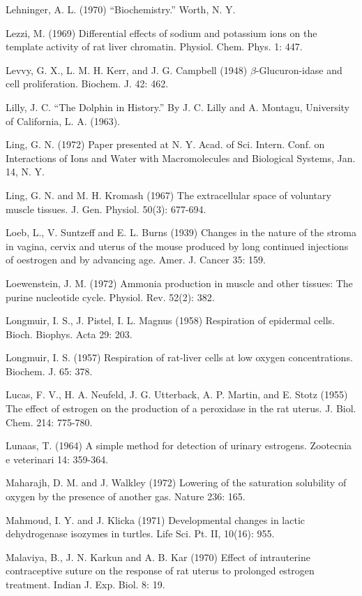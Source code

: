 
Lehninger, A. L. (1970) ``Biochemistry.'' Worth, N. Y.

Lezzi, M. (1969) Differential effects of sodium and potassium ions on the template activity of rat liver chromatin. Physiol. Chem. Phys. 1: 447.

Levvy, G. X., L. M. H. Kerr, and J. G. Campbell (1948) $\beta$-Glucuron-idase and cell proliferation. Biochem. J. 42: 462.

Lilly, J. C. ``The Dolphin in History.'' By J. C. Lilly and A. Montagu, University of California, L. A. (1963).

Ling, G. N. (1972) Paper presented at N. Y. Acad. of Sci. Intern. Conf. on Interactions of Ions and Water with Macromolecules and Biological Systems, Jan. 14, N. Y.

Ling, G. N. and M. H. Kromash (1967) The extracellular space of voluntary muscle tissues. J. Gen. Physiol. 50(3): 677-694.

Loeb, L., V. Suntzeff and E. L. Burns (1939) Changes in the nature of the stroma in vagina, cervix and uterus of the mouse produced by long continued injections of oestrogen and by advancing age. Amer. J. Cancer 35: 159.

Loewenstein, J. M. (1972) Ammonia production in muscle and other tissues: The purine nucleotide cycle. Physiol. Rev. 52(2): 382.

Longmuir, I. S., J. Pistel, I. L. Magnus (1958) Respiration of epidermal cells. Bioch. Biophys. Acta 29: 203.

Longmuir, I. S. (1957) Respiration of rat-liver cells at low oxygen concentrations. Biochem. J. 65: 378.

Lucas, F. V., H. A. Neufeld, J. G. Utterback, A. P. Martin, and E. Stotz (1955) The effect of estrogen on the production of a peroxidase in the rat uterus. J. Biol. Chem. 214: 775-780.

Lunaas, T. (1964) A simple method for detection of urinary estrogens. Zootecnia e veterinari 14: 359-364.

Maharajh, D. M. and J. Walkley (1972) Lowering of the saturation solubility of oxygen by the presence of another gas. Nature 236: 165.

Mahmoud, I. Y. and J. Klicka (1971) Developmental changes in lactic dehydrogenase isozymes in turtles. Life Sci. Pt. II, 10(16): 955.

Malaviya, B., J. N. Karkun and A. B. Kar (1970) Effect of intrauterine contraceptive suture on the response of rat uterus to prolonged estrogen treatment. Indian J. Exp. Biol. 8: 19.

